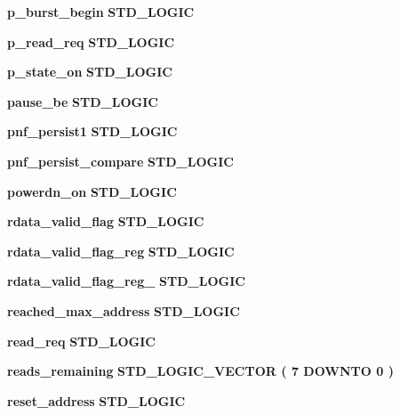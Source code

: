 \begin{DoxyCompactItemize}
\item 
{\bf p\+\_\+burst\+\_\+begin} {\bfseries \textcolor{comment}{S\+T\+D\+\_\+\+L\+O\+G\+IC}\textcolor{vhdlchar}{ }} 
\item 
{\bf p\+\_\+read\+\_\+req} {\bfseries \textcolor{comment}{S\+T\+D\+\_\+\+L\+O\+G\+IC}\textcolor{vhdlchar}{ }} 
\item 
{\bf p\+\_\+state\+\_\+on} {\bfseries \textcolor{comment}{S\+T\+D\+\_\+\+L\+O\+G\+IC}\textcolor{vhdlchar}{ }} 
\item 
{\bf pause\+\_\+be} {\bfseries \textcolor{comment}{S\+T\+D\+\_\+\+L\+O\+G\+IC}\textcolor{vhdlchar}{ }} 
\item 
{\bf pnf\+\_\+persist1} {\bfseries \textcolor{comment}{S\+T\+D\+\_\+\+L\+O\+G\+IC}\textcolor{vhdlchar}{ }} 
\item 
{\bf pnf\+\_\+persist\+\_\+compare} {\bfseries \textcolor{comment}{S\+T\+D\+\_\+\+L\+O\+G\+IC}\textcolor{vhdlchar}{ }} 
\item 
{\bf powerdn\+\_\+on} {\bfseries \textcolor{comment}{S\+T\+D\+\_\+\+L\+O\+G\+IC}\textcolor{vhdlchar}{ }} 
\item 
{\bf rdata\+\_\+valid\+\_\+flag} {\bfseries \textcolor{comment}{S\+T\+D\+\_\+\+L\+O\+G\+IC}\textcolor{vhdlchar}{ }} 
\item 
{\bf rdata\+\_\+valid\+\_\+flag\+\_\+reg} {\bfseries \textcolor{comment}{S\+T\+D\+\_\+\+L\+O\+G\+IC}\textcolor{vhdlchar}{ }} 
\item 
{\bf rdata\+\_\+valid\+\_\+flag\+\_\+reg\+\_} {\bfseries \textcolor{comment}{S\+T\+D\+\_\+\+L\+O\+G\+IC}\textcolor{vhdlchar}{ }} 
\item 
{\bf reached\+\_\+max\+\_\+address} {\bfseries \textcolor{comment}{S\+T\+D\+\_\+\+L\+O\+G\+IC}\textcolor{vhdlchar}{ }} 
\item 
{\bf read\+\_\+req} {\bfseries \textcolor{comment}{S\+T\+D\+\_\+\+L\+O\+G\+IC}\textcolor{vhdlchar}{ }} 
\item 
{\bf reads\+\_\+remaining} {\bfseries \textcolor{comment}{S\+T\+D\+\_\+\+L\+O\+G\+I\+C\+\_\+\+V\+E\+C\+T\+OR}\textcolor{vhdlchar}{ }\textcolor{vhdlchar}{(}\textcolor{vhdlchar}{ }\textcolor{vhdlchar}{ } \textcolor{vhdldigit}{7} \textcolor{vhdlchar}{ }\textcolor{keywordflow}{D\+O\+W\+N\+TO}\textcolor{vhdlchar}{ }\textcolor{vhdlchar}{ } \textcolor{vhdldigit}{0} \textcolor{vhdlchar}{ }\textcolor{vhdlchar}{)}\textcolor{vhdlchar}{ }} 
\item 
{\bf reset\+\_\+address} {\bfseries \textcolor{comment}{S\+T\+D\+\_\+\+L\+O\+G\+IC}\textcolor{vhdlchar}{ }} 
\item 

\end{DoxyCompactItemize}
